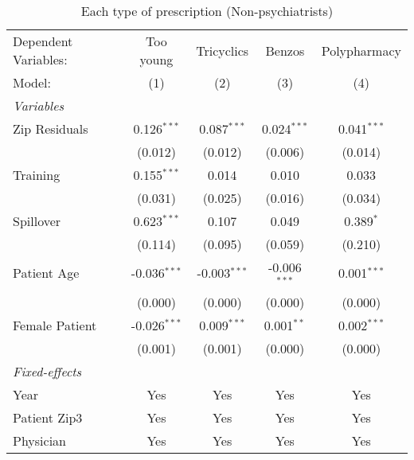 
\begin{table}[htbp]
   \centering
   \begin{threeparttable}[b]
      \caption{Each type of prescription (Non-psychiatrists)}
      \begin{tabular}{lcccc}
         \tabularnewline \midrule \midrule
         Dependent Variables:    & Too young      & Tricyclics     & Benzos         & Polypharmacy\\  
         Model:                  & (1)            & (2)            & (3)            & (4)\\  
         \midrule
         \emph{Variables}\\
         Zip Residuals           & 0.126$^{***}$  & 0.087$^{***}$  & 0.024$^{***}$  & 0.041$^{***}$\\   
                                 & (0.012)        & (0.012)        & (0.006)        & (0.014)\\   
         Training                & 0.155$^{***}$  & 0.014          & 0.010          & 0.033\\   
                                 & (0.031)        & (0.025)        & (0.016)        & (0.034)\\   
         Spillover               & 0.623$^{***}$  & 0.107          & 0.049          & 0.389$^{*}$\\   
                                 & (0.114)        & (0.095)        & (0.059)        & (0.210)\\   
         Patient Age             & -0.036$^{***}$ & -0.003$^{***}$ & -0.006$^{***}$ & 0.001$^{***}$\\   
                                 & (0.000)        & (0.000)        & (0.000)        & (0.000)\\   
         Female Patient          & -0.026$^{***}$ & 0.009$^{***}$  & 0.001$^{**}$   & 0.002$^{***}$\\   
                                 & (0.001)        & (0.001)        & (0.000)        & (0.000)\\   
         \midrule
         \emph{Fixed-effects}\\
         Year                    & Yes            & Yes            & Yes            & Yes\\  
         Patient Zip3            & Yes            & Yes            & Yes            & Yes\\  
         Physician               & Yes            & Yes            & Yes            & Yes\\  
         \midrule

\end{tabular}
\end{threeparttable}
\end{table}
